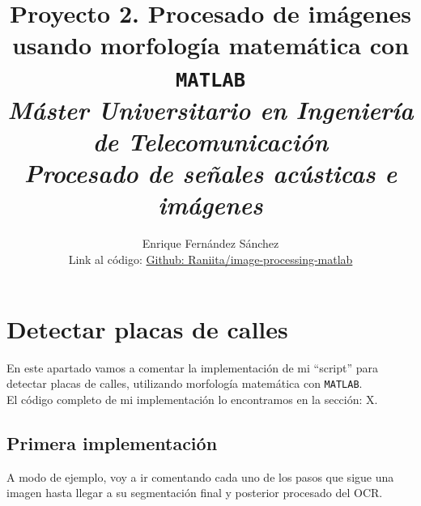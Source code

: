 \documentclass[12pt]{article}
\begin{document}
	
	\title{Proyecto 2. Procesado de imágenes usando morfología matemática con \texttt{MATLAB} \\ \textit{\textbf{\large Máster Universitario en Ingeniería de Telecomunicación}} \\ \textit{\large Procesado de señales acústicas e imágenes}}
	\author{Enrique Fernández Sánchez \\ Link al código: \href{https://github.com/Raniita/image-processing-matlab/tree/main/morfologia}{Github: Raniita/image-processing-matlab}}
	
	\maketitle
	
	\vspace{120px}
	
	\tableofcontents
	
	\pagebreak
	
	\lstlistoflistings
	
	\listoffigures
	
	\pagebreak
	
	\section{Detectar placas de calles}
	
	\noindent En este apartado vamos a comentar la implementación de mi ``script'' para detectar placas de calles, utilizando morfología matemática con \texttt{MATLAB}. \\
	
	\noindent El código completo de mi implementación lo encontramos en la sección: X.
	
	\subsection{Primera implementación}
	\noindent A modo de ejemplo, voy a ir comentando cada uno de los pasos que sigue una imagen hasta llegar a su segmentación final y posterior procesado del OCR.
	
\end{document}
